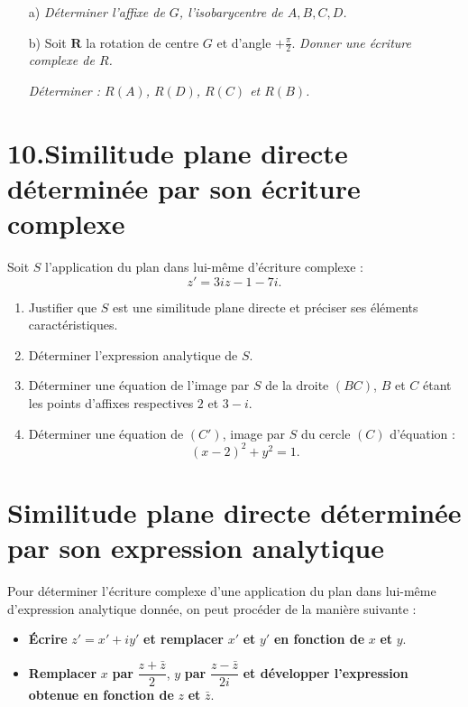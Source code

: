 \documentclass{article}
\begin{document}
\begin{itemize}
    \item[a)] \textit{Déterminer l’affixe de \( G \), l’isobarycentre de \( A, B, C, D \).}
    
    \item[b)] Soit \(\mathbf{R}\) la rotation de centre \( G \) et d’angle \( +\frac{\pi}{2} \). \textit{Donner une écriture complexe de \( R \).}
    
    \textit{Déterminer : \( R(A) \), \( R(D) \), \( R(C) \) et \( R(B) \).}
\end{itemize}

\section*{10.Similitude plane directe déterminée par son écriture complexe}

\vspace{0.3cm}

Soit \( S \) l’application du plan dans lui-même d’écriture complexe :
\[
z' = 3i z - 1 - 7i.
\]

\begin{enumerate}
    \item Justifier que \( S \) est une similitude plane directe et préciser ses éléments caractéristiques.
    
    \item Déterminer l’expression analytique de \( S \).
    
    \item Déterminer une équation de l’image par \( S \) de la droite \( (BC) \), \( B \) et \( C \) étant les points d’affixes respectives \( 2 \) et \( 3 - i \).
    \item Déterminer une équation de \( (C') \), image par \( S \) du cercle \( (C) \) d’équation :
\[
(x - 2)^2 + y^2 = 1.
\]

\end{enumerate}
\section*{Similitude plane directe déterminée par son expression analytique}

\vspace{0.3cm}

Pour déterminer l’écriture complexe d’une application du plan dans lui-même d’expression analytique donnée, on peut procéder de la manière suivante :

\begin{itemize}
    \item \textbf{Écrire} \( z' = x' + i y' \) \textbf{et remplacer} \( x' \) \textbf{et} \( y' \) \textbf{en fonction de} \( x \) \textbf{et} \( y \).
    \item \textbf{Remplacer} \( x \) \textbf{par} \( \dfrac{z + \bar{z}}{2} \), \quad \( y \) \textbf{par} \( \dfrac{z - \bar{z}}{2i} \) \textbf{et développer l’expression obtenue en fonction de} \( z \) \textbf{et} \( \bar{z} \).
\end{itemize}
\end{document}
